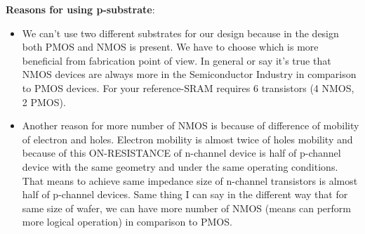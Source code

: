 \textbf{Reasons for using p-substrate}:\begin{itemize}
\item We can't use two different substrates for our design because in the design both PMOS and NMOS is present.
We have to choose which is more beneficial from fabrication point of view.
In general or say it's true that NMOS devices are always more in the Semiconductor Industry in comparison to PMOS devices.
For your reference-SRAM requires 6 transistors (4 NMOS, 2 PMOS).
\item Another reason for more number of NMOS is because of difference of mobility of electron and holes.
Electron mobility is almost twice of holes mobility and because of this ON-RESISTANCE of n-channel device is half of p-channel device with the same geometry and under the same operating conditions.
That means to achieve same impedance size of n-channel transistors is almost half of p-channel devices.
Same thing I can say in the different way that for same size of wafer, we can have more number of NMOS (means can perform more logical operation) in comparison to PMOS.
\end{itemize}
